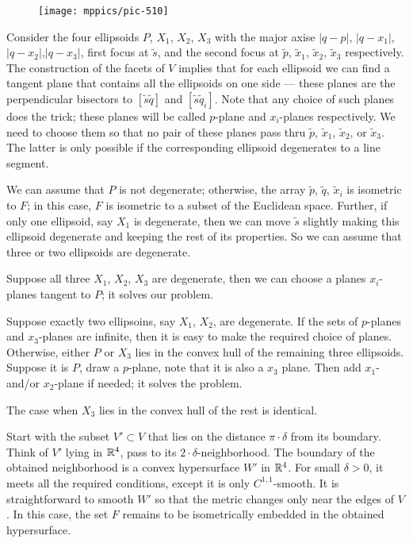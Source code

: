 \documentclass{article}
\begin{document}
\begin{wrapfigure}{r}{30mm}
\vskip-0mm
\centering
\texttt{[image: mppics/pic-510]}
\end{wrapfigure}

Consider the four ellipsoids $P$, $X_1$, $X_2$, $X_3$ with the major axise $|q-p|$, $|q-x_1|$, $|q-x_2|$,$|q-x_3|$, first focus at $\tilde s$, and the second focus at $\tilde p$, $\tilde x_1$, $\tilde x_2$, $\tilde x_3$ respectively.
The construction of the facets of $V$ implies that for each ellipsoid we can find a tangent plane that contains all the ellipsoids on one side --- these planes are the perpendicular bisectors to $[\tilde s\tilde q]$ and $[\tilde s\tilde q_i]$.
Note that any choice of such planes does the trick;
these planes will be called $p$-plane and $x_i$-planes respectively.
We need to choose them so that no pair of these planes pass thru $\tilde p$, $\tilde x_1$, $\tilde x_2$, or $\tilde x_3$.
The latter is only possible if the corresponding ellipsoid degenerates to a line segment.

We can assume that $P$ is not degenerate; otherwise, the array $\tilde p$, $\tilde q$, $\tilde x_i$ is isometric to $F$;
in this case, $F$ is isometric to a subset of the Euclidean space.
Further, if only one ellipsoid, say $X_1$ is degenerate, then we can move $\tilde s$ slightly making this ellipsoid degenerate and keeping the rest of its properties.
So we can assume that three or two ellipsoids are degenerate.

Suppose all three $X_1$, $X_2$, $X_3$ are degenerate, then we can choose a planes $x_i$-planes tangent to $P$; it solves our problem.

Suppose exactly two ellipsoins, say $X_1$, $X_2$,  are degenerate.
If the sets of $p$-planes and $x_3$-planes are infinite, then it is easy to make the required choice of planes.
Otherwise, either $P$ or $X_3$ lies in the convex hull of the remaining three ellipsoids.
Suppose it is $P$, draw a $p$-plane, note that it is also a $x_3$ plane.
Then add $x_1$- and/or $x_2$-plane if needed;
it solves the problem.

The case when $X_3$ lies in the convex hull of the rest is identical.

Start with the subset $V'\subset V$ that lies on the distance $\pi\cdot\delta$ from its boundary.
Think of $V'$ lying in $\mathbb{R}^4$, pass to its $2\cdot \delta$-neighborhood.
The boundary of the obtained neighborhood is a convex hypersurface $W'$ in $\mathbb{R}^4$.
For small $\delta>0$, it meets all the required conditions, except it is only $C^{1,1}$-smooth.
It is straightforward to smooth $W'$ so that the metric changes only near the edges of $V$.
In this case, the set $F$ remains to be isometrically embedded in the obtained hypersurface.
\qeds
\end{document}

